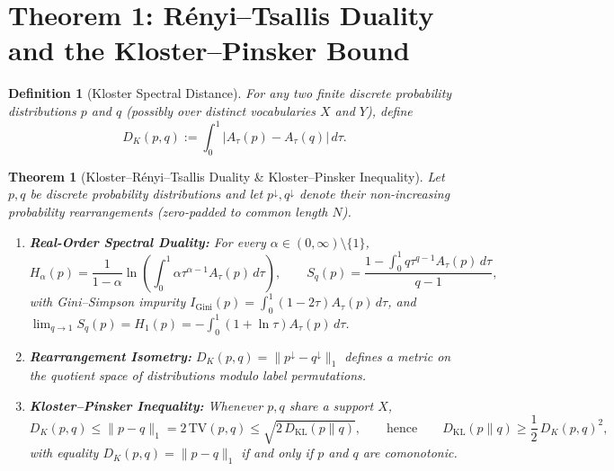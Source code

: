 \documentclass[11pt,letterpaper]{article}
\newtheorem{theorem}{Theorem}
\newtheorem{definition}{Definition}
\begin{document}
\section{Theorem 1: R\'enyi--Tsallis Duality and the Kloster--Pinsker Bound}
\begin{definition}[Kloster Spectral Distance]
For any two finite discrete probability distributions $p$ and $q$ (possibly over distinct vocabularies $X$ and $Y$), define
\begin{equation}
  D_K(p, q) := \int_0^1 \big|A_\tau(p) - A_\tau(q)\big|\,d\tau.
\end{equation}
\end{definition}

\begin{theorem}[Kloster--R\'enyi--Tsallis Duality \& Kloster--Pinsker Inequality]
\label{thm:pinsker}
Let $p, q$ be discrete probability distributions and let $p^\downarrow, q^\downarrow$ denote their non-increasing probability rearrangements (zero-padded to common length $N$).
\begin{enumerate}
  \item \textbf{Real-Order Spectral Duality:} For every $\alpha \in (0, \infty) \setminus \{1\}$,
  \begin{equation}
    H_\alpha(p) = \frac{1}{1-\alpha}\ln\!\left(\int_0^1 \alpha \tau^{\alpha-1} A_\tau(p)\,d\tau\right),
    \qquad
    S_q(p) = \frac{1 - \int_0^1 q \tau^{q-1} A_\tau(p)\,d\tau}{q - 1},
  \end{equation}
  with Gini--Simpson impurity $I_{\mathrm{Gini}}(p) = \int_0^1 (1 - 2\tau) A_\tau(p)\,d\tau$, and $\lim_{q \to 1} S_q(p) = H_1(p) = -\int_0^1 (1 + \ln \tau) A_\tau(p)\,d\tau$.
  \item \textbf{Rearrangement Isometry:} $D_K(p, q) = \|p^\downarrow - q^\downarrow\|_1$ defines a metric on the quotient space of distributions modulo label permutations.
  \item \textbf{Kloster--Pinsker Inequality:} Whenever $p, q$ share a support $X$,
  \begin{equation}
    D_K(p, q) \le \|p - q\|_1 = 2\,\mathrm{TV}(p, q) \le \sqrt{2\,D_{\mathrm{KL}}(p \parallel q)},
    \qquad\text{hence}\qquad
    D_{\mathrm{KL}}(p \parallel q) \ge \frac{1}{2}\,D_K(p, q)^2,
  \end{equation}
  with equality $D_K(p, q) = \|p - q\|_1$ if and only if $p$ and $q$ are comonotonic.
\end{enumerate}
\end{theorem}
\end{document}
